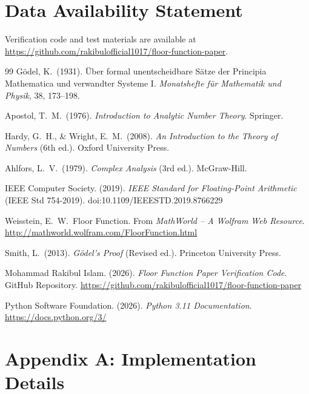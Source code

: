 \documentclass[12pt, a4paper]{article}
\theoremstyle{note}
\begin{document}
\section*{Data Availability Statement}

Verification code and test materials are available at \url{https://github.com/rakibulofficial1017/floor-function-paper}.



\begin{thebibliography}{99}
 Gödel, K.\ (1931). Über formal unentscheidbare Sätze der Principia Mathematica und verwandter Systeme I. \textit{Monatshefte für Mathematik und Physik}, 38, 173–198.

 Apostol, T.\ M.\ (1976). \textit{Introduction to Analytic Number Theory}. Springer.

 Hardy, G.\ H., \& Wright, E.\ M.\ (2008). \textit{An Introduction to the Theory of Numbers} (6th ed.). Oxford University Press.

 Ahlfors, L.\ V.\ (1979). \textit{Complex Analysis} (3rd ed.). McGraw-Hill.

 IEEE Computer Society. (2019). \textit{IEEE Standard for Floating-Point Arithmetic} (IEEE Std 754-2019). doi:10.1109/IEEESTD.2019.8766229

 Weisstein, E.\ W.\ Floor Function. From \textit{MathWorld – A Wolfram Web Resource}. \url{http://mathworld.wolfram.com/FloorFunction.html}

 Smith, L.\ (2013). \textit{Gödel's Proof} (Revised ed.). Princeton University Press.

 Mohammad Rakibul Islam. (2026). \textit{Floor Function Paper Verification Code}. GitHub Repository. \url{https://github.com/rakibulofficial1017/floor-function-paper}

 Python Software Foundation. (2026). \textit{Python 3.11 Documentation}. \url{https://docs.python.org/3/}
\end{thebibliography}

\section*{Appendix A: Implementation Details}
\end{document}
